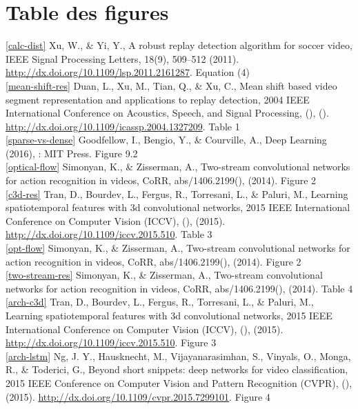 \documentclass[11pt]{article}
\begin{document}
\newpage
\section{Table des figures}
\label{sec:org044dc25}
\ref{calc-dist} Xu, W., \& Yi, Y., A robust replay detection algorithm for soccer video, IEEE Signal Processing Letters, 18(9), 509–512 (2011).  \url{http://dx.doi.org/10.1109/lsp.2011.2161287}. Equation (4)\\

\ref{mean-shift-res} Duan, L., Xu, M., Tian, Q., \& Xu, C., Mean shift based video segment representation and applications to replay detection, 2004 IEEE International Conference on Acoustics, Speech, and Signal Processing, (),  ().  \url{http://dx.doi.org/10.1109/icassp.2004.1327209}. Table 1\\

\ref{sparse-vs-dense} Goodfellow, I., Bengio, Y., \& Courville, A., Deep Learning (2016), : MIT Press. \cite{Goodfellow-et-al-2016} Figure 9.2\\

\ref{optical-flow} Simonyan, K., \& Zisserman, A., Two-stream convolutional networks for action recognition in videos, CoRR, abs/1406.2199(),  (2014). Figure 2\\

\ref{c3d-res} Tran, D., Bourdev, L., Fergus, R., Torresani, L., \& Paluri, M., Learning spatiotemporal features with 3d convolutional networks, 2015 IEEE International Conference on Computer Vision (ICCV), (),  (2015).  \url{http://dx.doi.org/10.1109/iccv.2015.510}. Table 3\\

\ref{opt-flow} Simonyan, K., \& Zisserman, A., Two-stream convolutional networks for action recognition in videos, CoRR, abs/1406.2199(),  (2014). Figure 2\\

\ref{two-stream-res} Simonyan, K., \& Zisserman, A., Two-stream convolutional networks for action recognition in videos, CoRR, abs/1406.2199(),  (2014). Table 4\\

\ref{arch-c3d} Tran, D., Bourdev, L., Fergus, R., Torresani, L., \& Paluri, M., Learning spatiotemporal features with 3d convolutional networks, 2015 IEEE International Conference on Computer Vision (ICCV), (),  (2015).  \url{http://dx.doi.org/10.1109/iccv.2015.510}. Figure 3\\

\ref{arch-lstm} Ng, J. Y., Hausknecht, M., Vijayanarasimhan, S., Vinyals, O., Monga, R., \& Toderici, G., Beyond short snippets: deep networks for video classification, 2015 IEEE Conference on Computer Vision and Pattern Recognition (CVPR), (),  (2015).  \url{http://dx.doi.org/10.1109/cvpr.2015.7299101}. Figure 4\\
\end{document}
